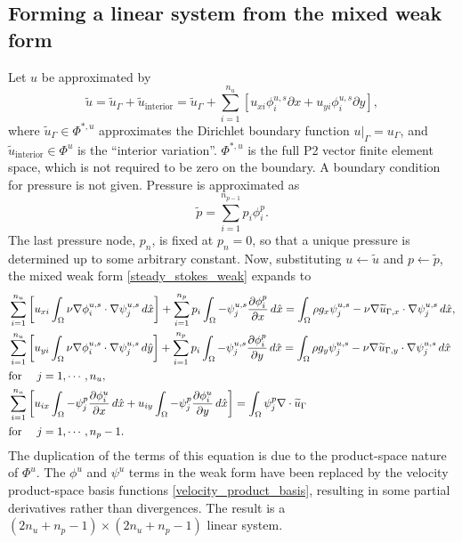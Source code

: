 \subsection{Forming a linear system from the mixed weak form}
Let $u$ be approximated by
$$\tilde{u} = \tilde{u}_\Gamma + \tilde{u}_\text{interior} = \tilde{u}_\Gamma +
    \sum_{i=1}^{n_u}\left[
    u_{xi}\phi^{u,s}_i\partial x
    +
    u_{yi}\phi^{u,s}_i\partial y\right],
$$
where $\tilde{u}_\Gamma \in \Phi^{*,u}$ approximates the Dirichlet boundary function $\left.u\right|_\Gamma = u_\Gamma$,
and $\tilde{u}_{\text{interior}} \in \Phi^u$ is the ``interior variation''.
$\Phi^{*,u}$ is the full P2 vector finite element space, which is not required to be zero on the boundary.
A boundary condition for pressure is not given. Pressure is approximated as
    $$\tilde{p} = \sum_{i=1}^{n_{p-1}} p_i\phi^p_i.$$
The last pressure node, $p_n$, is fixed at $p_n = 0$, so that a unique pressure is determined up to some arbitrary constant.
Now, substituting $u \leftarrow \tilde{u}$ and $p \leftarrow \tilde{p}$, the mixed weak form \eqref{steady_stokes_weak} expands to
\begin{equation}\label{steady_stokes_linear_system}
\begin{split}
&\sum_{i=1}^{n_u} \left[u_{xi}\int_\Omega \nu\nabla\phi^{u,s}_i \cdot \nabla\psi^{u,s}_j\,d\hat{x}\right]
        + \sum_{i=1}^{n_p} p_i\int_\Omega -\psi^{u,s}_j \frac{\partial \phi^p_{i}}{\partial x}\,d\hat{x}
    = \int_\Omega \rho g_x \psi^{u,s}_j
        - \nu\nabla\widetilde{u}_{\Gamma,x} \cdot \nabla\psi^{u,s}_j \,d\hat{x},\\
    &\sum_{i=1}^{n_u} \left[u_{yi}\int_\Omega \nu\nabla\phi^{u,s}_i \cdot \nabla\psi^{u,s}_j\,d\hat{y}\right]
            + \sum_{i=1}^{n_p} p_i\int_{\Omega} -\psi^{u,s}_j \frac{\partial \phi^p_{i}}{\partial y}\,d\hat{x}
        = \int_\Omega \rho g_y \psi^{u,s}_j
            - \nu\nabla\widetilde{u}_{\Gamma,y} \cdot \nabla\psi^{u,s}_j \,d\hat{x}\\
    &\text{for \quad} j=1,\cdots,n_u,\\
    &\sum_{i=1}^{n_u} \left[u_{ix} \int_\Omega -\psi^p_j \frac{\partial \phi^u_i}{\partial x} \,d\hat{x}
    + u_{iy} \int_\Omega -\psi^p_j \frac{\partial \phi^u_i}{\partial y} \,d\hat{x}\right]
        = \int_\Omega \psi^p_j \nabla \cdot \widetilde{u}_\Gamma\\
    &\text{for \quad} j=1,\cdots,n_p-1.\\
\end{split}
\end{equation}
The duplication of the terms of this equation is due to the product-space nature of $\Phi^u$. The $\phi^u$ and $\psi^u$ terms
in the weak form have been replaced by the velocity product-space basis functions \eqref{velocity_product_basis}, resulting
in some partial derivatives rather than divergences. The result is a $(2n_u + n_p - 1)\times (2n_u + n_p - 1)$ linear system.


